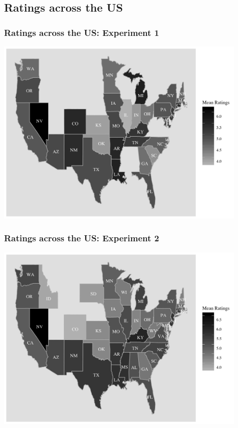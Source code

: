 \documentclass{beamer}
\begin{document}
\subsection{Ratings across the US}
\begin{frame}
\frametitle{Ratings across the US: Experiment 1}
\centering
\includegraphics[width=0.9\textwidth]{figures/sup/exp1.png}
\end{frame}

\begin{frame}
\frametitle{Ratings across the US: Experiment 2}
\centering
\includegraphics[width=0.9\textwidth]{figures/sup/exp2.png}

\end{frame}
\end{document}
